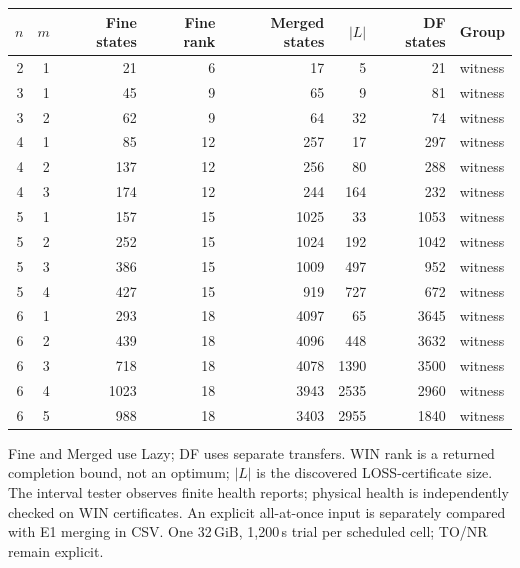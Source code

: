 \begin{tabular}{rrrrrrrl}
\toprule
$n$ & $m$ & Fine states & Fine rank & Merged states & $|L|$ & DF states & Group \\
\midrule
2 & 1 & 21 & 6 & 17 & 5 & 21 & witness \\
3 & 1 & 45 & 9 & 65 & 9 & 81 & witness \\
3 & 2 & 62 & 9 & 64 & 32 & 74 & witness \\
4 & 1 & 85 & 12 & 257 & 17 & 297 & witness \\
4 & 2 & 137 & 12 & 256 & 80 & 288 & witness \\
4 & 3 & 174 & 12 & 244 & 164 & 232 & witness \\
5 & 1 & 157 & 15 & 1025 & 33 & 1053 & witness \\
5 & 2 & 252 & 15 & 1024 & 192 & 1042 & witness \\
5 & 3 & 386 & 15 & 1009 & 497 & 952 & witness \\
5 & 4 & 427 & 15 & 919 & 727 & 672 & witness \\
6 & 1 & 293 & 18 & 4097 & 65 & 3645 & witness \\
6 & 2 & 439 & 18 & 4096 & 448 & 3632 & witness \\
6 & 3 & 718 & 18 & 4078 & 1390 & 3500 & witness \\
6 & 4 & 1023 & 18 & 3943 & 2535 & 2960 & witness \\
6 & 5 & 988 & 18 & 3403 & 2955 & 1840 & witness \\
\bottomrule
\end{tabular}
{\par\smallskip\footnotesize Fine and Merged use Lazy; DF uses separate transfers. WIN rank is a returned completion bound, not an optimum; $|L|$ is the discovered LOSS-certificate size. The interval tester observes finite health reports; physical health is independently checked on WIN certificates. An explicit all-at-once input is separately compared with E1 merging in CSV. One 32\,GiB, 1,200\,s trial per scheduled cell; TO/NR remain explicit.}
